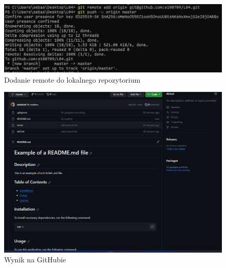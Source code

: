 \documentclass{article} %
\begin{document}
\begin{figure}
	\centering
	\includegraphics[width=1\textwidth]{image/git/25.png}
	\caption{Dodanie remote do lokalnego repozytorium}
\end{figure}

\begin{figure}
	\centering
	\includegraphics[width=1\textwidth]{image/git/26.png}
	\caption{Wynik na GitHubie}
\end{figure}
\end{document}
